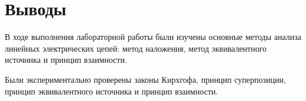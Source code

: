 \section{Выводы}

В ходе выполнения лабораторной работы были изучены основные методы
анализа линейных электрических цепей: метод наложения, 
метод эквивалентного источника и принцип взаимности. 

Были экспериментально проверены законы Кирхгофа, 
принцип суперпозиции, принцип эквивалентного источника и принцип взаимности.

